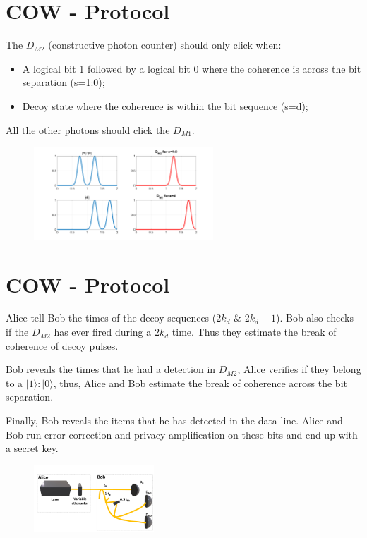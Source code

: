 \documentclass[1000pt]{article}
\newcommand{\mysection}[1]{\section*{\color{black}\sffamily #1}}%
\begin{document}

\mysection{\Huge COW - Protocol}\Large
The $D_{M2}$ (constructive photon counter) should only click when:
\begin{itemize}
\item A logical bit 1 followed by a logical bit 0 where the coherence is across the bit separation (s=1:0);
\item Decoy state where the coherence is within the bit sequence (s=d);
\end{itemize}
All the other photons should click the $D_{M1}$.
  \begin{figure}[hbt]
    	\centering
    	\includegraphics[width=0.6\textwidth]{./figures/Simple2.png}
        	\label{Simple2}
    \end{figure}

\mysection{\Huge COW - Protocol}\Large
\begin{description}
\vspace{10mm}
\item [Step 3] Alice tell Bob the times of the decoy sequences ($2k_d$  \& $ 2k_d-1$). Bob also checks if the $D_{M2}$ has ever fired during a $2k_d$ time. Thus they estimate the break of coherence of decoy pulses.
\vspace{3mm}
\item [Step 4] Bob reveals the times that he had a detection in $D_{M2}$, Alice verifies if they belong to a $|1\rangle:|0\rangle$, thus, Alice and Bob estimate the break of coherence across the bit separation.
\vspace{3mm}
\item [Step 5] Finally, Bob reveals the items that he has detected in the data line. Alice and Bob run error correction and privacy amplification on these bits and end up with a secret key.
  \begin{figure}[hbt]
    	\centering
    	\includegraphics[width=0.4\textwidth]{./figures/Full2.pdf}
        	\label{Simple2}
    \end{figure}
\end{description}
\end{document}
